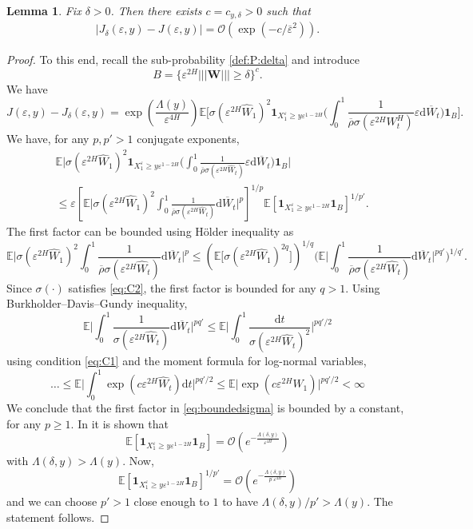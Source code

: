 \documentclass[11pt]{article}
\theoremstyle{plain}
\newtheorem{lemma}[theorem]{Lemma}
\theoremstyle{definition}
\theoremstyle{remark}
\renewcommand{\bar}{\overline}
\renewcommand{\hat}{\widehat}
\newcommand{\dd}{\mathrm{d}}
\newcommand{\bE}{\mathbb{E}}
\newcommand{\cO}{\mathcal{O}}
\newcommand{\1}{\mathbf{1}}
\numberwithin{equation}{section}
\def\eps{\varepsilon}
\def\WW{\mathbf W}
\begin{document}
\begin{lemma}\label{prop:algebraic:equivalence}
Fix $\delta > 0$. Then there exists $c=c_{y,\delta}>0$ such that
\[
\begin{split}
     | J_\delta (\eps, y) - J (\eps, y) | = \cO(\exp (- c / \bar \eps^2)).
\end{split}
\]
\end{lemma}

\begin{proof}
To this end, recall the sub-probability \eqref{def:P:delta} and introduce 
\[
B=\{  \eps^{2H} ||| \WW ||| \geq \delta     \}^c.
\]
We have
\begin{equation}
J (\eps, y) -J_\delta (\eps, y)
= \exp \left( {  \frac{\Lambda(y)}{\eps^{4H}}  } \right) 
\bE\big[\sigma(\eps^{2H}\hat{W}_1)^2 \1_{X_1^\eps \geq y \eps^{1-2H}} \big( \int_0^1\frac{1}{\bar{\rho} 
	\sigma(\eps^{2H} W^H_t) } \eps  \dd \bar{W}_t\big)\1_B\big].
\end{equation}
We have, for any $p,p'>1$ conjugate exponents,
\begin{equation}\label{eq:boundedsigma}
\begin{split}
&\bE\big|\sigma(\eps^{2H}\hat{W}_1)^2 \1_{X_1^\eps \geq y \eps^{1-2H}} \big( \int_0^1\frac{1}{\bar{\rho} \sigma(\eps^{2H} \hat{W}_t) } \eps  \dd \bar{W}_t\big)\1_B\big|
\\
&\leq \eps
\left[\bE\big|\sigma(\eps^{2H}\hat{W}_1)^2  \int_0^1\frac{1}{\bar{\rho} \sigma(\eps^{2H}  \hat{W}_t) }  \dd \bar{W}_t \big|^p\right]^{1/p}
\bE[ \1_{X_1^\eps \geq y \eps^{1-2H}} \1_B]^{1/p'}.
\end{split}
\end{equation}
The first factor can be bounded using H\"{o}lder inequality as
\[
\bE\big|\sigma(\eps^{2H}\hat{W}_1)^2  \int_0^1\frac{1}{\bar{\rho} \sigma(\eps^{2H}  \hat{W}_t) }  \dd \bar{W}_t \big|^p
\leq
(\bE\big[ \sigma(\eps^{2H}\hat{W}_1)^{2q}\big])^{1/q}
\Big(\bE\big|\int_0^1\frac{1}{\bar{\rho} \sigma(\eps^{2H}  \hat{W}_t) }  \dd \bar{W}_t \big|^{pq'}\Big)^{1/{q'}}.
\]
Since $\sigma(\cdot)$ satisfies \eqref{eq:C2}, the first factor is bounded for any $q>1$. 
{Using Burkholder--Davis--Gundy inequality, }
\[
\bE\big|\int_0^1\frac{1}{\sigma(\eps^{2H}  \hat{W}_t) }  \dd \bar{W}_t \big|^{pq'}
\leq
\bE\big|\int_0^1\frac{\dd t}{ \sigma(\eps^{2H}  \hat{W}_t)^2 }  \big|^{pq'/2}
\]
using condition \eqref{eq:C1} and the moment formula for log-normal variables,
\[
\dots \leq \bE\big|\int_0^1 \exp(c \eps^{2H}  \hat{W}_t) \dd t   \big|^{pq'/2}
\leq \bE\big| \exp(c \eps^{2H}  \hat{W}_1) \big|^{pq'/2} <\infty
\]
We conclude that the first factor in \eqref{eq:boundedsigma} is bounded by a constant, for any $p\geq1$. In \cite[lines after (8.5)]{friz2018precise1} it is shown that 
\[
\bE[ \1_{X_1^\eps \geq y \eps^{1-2H}} \1_B ]
=
\cO(e^{- \frac{\Lambda(\delta,y)}{\eps^{4H}}})
\]
with $\Lambda(\delta,y)>\Lambda(y)$. Now,
\[
\bE[ \1_{X_1^\eps \geq y \eps^{1-2H}} \1_B]^{1/p'}
=
\cO(e^{- \frac{\Lambda(\delta,y)}{p^{\prime} \eps^{4H}}})
\]
and we can choose $p'>1$ close enough to $1$ to have $\Lambda(\delta,y)/p'>\Lambda(y)$. The statement follows.
\end{proof}
\end{document}
